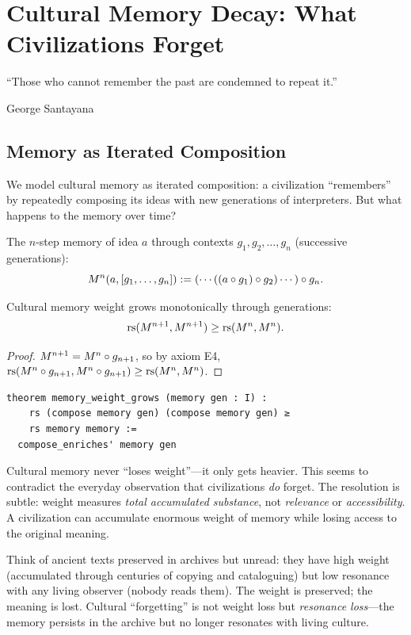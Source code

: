 
\chapter{Cultural Memory Decay: What Civilizations Forget}
\label{ch:memory}

\epigraph{``Those who cannot remember the past are condemned to repeat
it.''}{George Santayana}

\section{Memory as Iterated Composition}

We model cultural memory as iterated composition: a civilization
``remembers'' by repeatedly composing its ideas with new generations of
interpreters.  But what happens to the memory over time?

\begin{definition}
The $n$-step memory of idea $a$ through contexts
$g_1, g_2, \ldots, g_n$ (successive generations):
\[
  M^n(a, [g_1, \ldots, g_n]) := (\cdots((a \circ g_1) \circ g_2)
    \cdots) \circ g_n.
\]
\end{definition}

\begin{theorem}
\label{thm:memory-mono}
Cultural memory weight grows monotonically through generations:
\[
  \mathrm{rs}(M^{n+1}, M^{n+1}) \geq \mathrm{rs}(M^n, M^n).
\]
\end{theorem}

\begin{proof}
$M^{n+1} = M^n \circ g_{n+1}$, so by axiom E4,
$\mathrm{rs}(M^n \circ g_{n+1}, M^n \circ g_{n+1}) \geq \mathrm{rs}(M^n, M^n)$.
\end{proof}

\begin{lstlisting}
theorem memory_weight_grows (memory gen : I) :
    rs (compose memory gen) (compose memory gen) ≥
    rs memory memory :=
  compose_enriches' memory gen
\end{lstlisting}

\begin{remark}
Cultural memory never ``loses weight''---it only gets heavier.  This
seems to contradict the everyday observation that civilizations
\emph{do} forget.  The resolution is subtle: weight measures
\emph{total accumulated substance}, not \emph{relevance} or
\emph{accessibility}.  A civilization can accumulate enormous weight
of memory while losing access to the original meaning.

Think of ancient texts preserved in archives but unread: they have high
weight (accumulated through centuries of copying and cataloguing) but
low resonance with any living observer (nobody reads them).  The weight
is preserved; the meaning is lost.  Cultural ``forgetting'' is not
weight loss but \emph{resonance loss}---the memory persists in the
archive but no longer resonates with living culture.
\end{remark}

